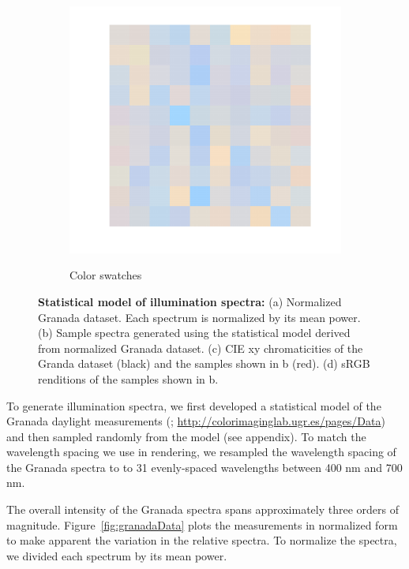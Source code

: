 \documentclass{jov}
\begin{document}
\begin{figure}
\begin{subfigure}[b]{0.24 \textwidth}
        \label{fig:xyDiagram}
        \end{subfigure}
      	\begin{subfigure}[b]{0.24 \textwidth}
    \centering
        \caption{Color swatches}
        \includegraphics[width=\textwidth]{../FiguresDraft5/Figure6/Figure6_d.pdf}
        \label{fig:sRGBIlluminant}
    \end{subfigure}
    \caption{{\bf Statistical model of illumination spectra:} (a) Normalized Granada dataset. Each spectrum is normalized by its mean power. (b) Sample spectra generated using the statistical model derived from normalized Granada dataset. (c) CIE xy chromaticities of the Granda dataset (black) and the samples shown in b (red). (d) sRGB renditions of the samples shown in b.}
\label{fig:illuminant}
\end{figure}

To generate illumination spectra, we first developed a statistical model of the Granada daylight measurements (; \href{http://colorimaginglab.ugr.es/pages/Data}{http://colorimaginglab.ugr.es/pages/Data}) and then sampled randomly from the model (see appendix).
To match the wavelength spacing we use in rendering, we resampled the wavelength spacing of the Granada spectra to
to 31 evenly-spaced wavelengths between 400 nm and 700 nm.

The overall intensity of the Granada spectra spans approximately three orders of magnitude.
Figure~\ref{fig:granadaData} plots the measurements in normalized form to make apparent the variation in the relative spectra.
To normalize the spectra, we divided each spectrum by its mean power.
\end{document}
